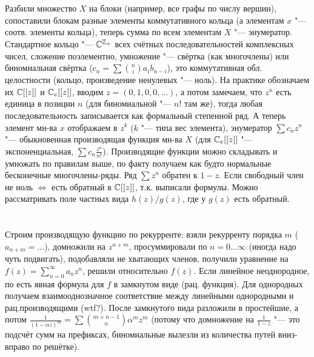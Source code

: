 \section{} %
Разбили множество $X$ на блоки (например, все графы по числу вершин), сопоставили блокам разные элементы
коммутативного кольца (а элементам $x$ "--- соотв. элементы кольца), теперь сумма по всем элементам $X$ "--- энумератор.
Стандартное кольцо "--- $\mathbb{C}^{\mathbb{Z}_+}$ всех счётных последовательностей комплексных чисел, сложение поэлементно,
умножение "--- свёртка (как многочлены) или биномиальная свёртка ($c_n=\sum \binom{n}{i}a_ib_{n-i}$), это коммутативная
обл. целостности (кольцо, произведение ненулевых "--- ноль).
На практике обозначаем их $\mathbb{C}[[z]]$ и $\mathbb{C}_e[[z]]$, вводим $z=(0,1,0,0,\dots)$, а потом замечаем, что $z^n$ есть единица в позиции $n$
(для биномиальной "--- $n!$ там же), тогда любая последовательность записывается как формальный степенной ряд.
А теперь элемент мн-ва $x$ отображаем в $z^k$ ($k$ "--- типа вес элемента), энумератор $\sum c_nz^n$ "--- обыкновенная производящая функция
мн-ва $X$ (для $\mathbb{C}_e[[z]]$ "--- экспоненциальная, $\sum c_n\frac{z^n}{n!}$).
Производящие функции можно складывать и умножать по правилам выше, по факту получаем как будто нормальные бесконечные многочлены-ряды.
Ряд $\sum z^n$ обратен к $1-z$.
Если свободный член не ноль $\iff$ есть обратный в $\mathbb{C}[[z]]$, т.к. выписали формулы.
Можно рассматривать поле частных вида $h(z)/g(z)$, где у $g(z)$ есть обратный.

\section{} %
Строим производящую функцию по рекурренте: взяли рекурренту порядка $m$ ($a_{n+m}=\dots$), домножили на $z^{n+m}$, просуммировали по $n=0\dots\infty$
(иногда надо чуть подвигать), подобавляли не хватающих членов, получили уравнение на $f(z)=\sum_{n=0}^\infty a_nz^n$, решили
относительно $f(z)$.
Если линейное неоднородное, по есть явная формула для $f$ в замкнутом виде (рац. функция).
Для однородных получаем взаимооднозначное соответствие между линейными однородными и рац.производящими (\TODO wtf?).
После замкнутого вида разложили в простейшие, а потом $\frac{1}{(1-\alpha z)^m}=\sum \binom{m+n-1}{n} \alpha^m z^m$ (потому что домножение
на $\frac{1}{1-z}$ "--- это подсчёт сумм на префиксах, биномиальные вылезли из количества путей вниз-вправо по решётке).

